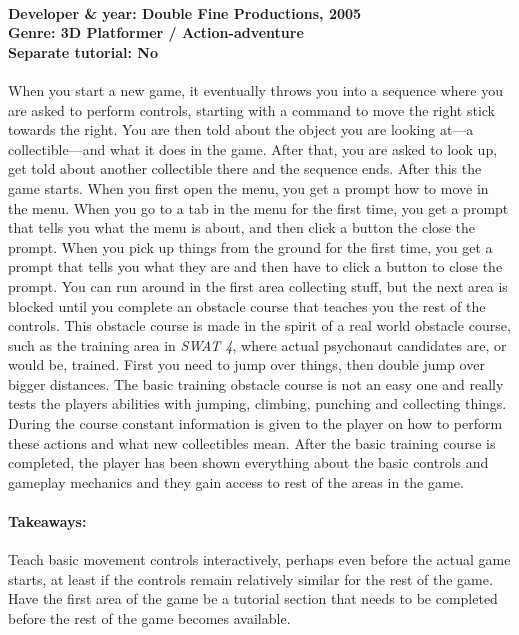\paragraph{Developer \& year: Double Fine Productions, 2005 \\ Genre: 3D Platformer / Action-adventure \\ Separate tutorial: No \\}
When you start a new game, it eventually throws you into a sequence where you are asked to perform controls, starting with a command to move the right stick towards the right. You are then told about the object you are looking at---a collectible---and what it does in the game. After that, you are asked to look up, get told about another collectible there and the sequence ends. After this the game starts.
When you first open the menu, you get a prompt how to move in the menu.
When you go to a tab in the menu for the first time, you get a prompt that tells you what the menu is about, and then click a button the close the prompt.
When you pick up things from the ground for the first time, you get a prompt that tells you what they are and then have to click a button to close the prompt.
You can run around in the first area collecting stuff, but the next area is blocked until you complete an obstacle course that teaches you the rest of the controls. This obstacle course is made in the spirit of a real world obstacle course, such as the training area in \textit{SWAT 4}, where actual psychonaut candidates are, or would be, trained. First you need to jump over things, then double jump over bigger distances.
The basic training obstacle course is not an easy one and really tests the players abilities with jumping, climbing, punching and collecting things. During the course constant information is given to the player on how to perform these actions and what new collectibles mean.
After the basic training course is completed, the player has been shown everything about the basic controls and gameplay mechanics and they gain access to rest of the areas in the game.
\paragraph{Takeaways:}
Teach basic movement controls interactively, perhaps even before the actual game starts, at least if the controls remain relatively similar for the rest of the game.
Have the first area of the game be a tutorial section that needs to be completed before the rest of the game becomes available.

